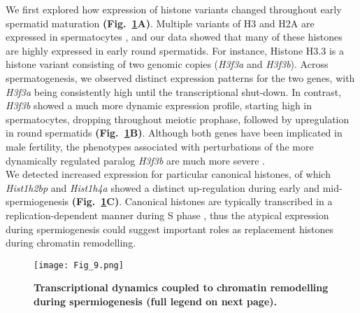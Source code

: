 We first explored how expression of histone variants changed throughout early spermatid maturation \textbf{(Fig.~\ref{fig3:spermiogenesis}A)}. Multiple variants of H3 and H2A are expressed in spermatocytes \citep{Greaves2006, Mahadevaiah2001, Tang2015}, and our data showed that many of these histones are highly expressed in early round spermatids. For instance, Histone H3.3 is a histone variant consisting of two genomic copies (\textit{H3f3a} and \textit{H3f3b}). Across spermatogenesis, we observed distinct expression patterns for the two genes, with \textit{H3f3a} being consistently high until the transcriptional shut-down. In contrast, \textit{H3f3b} showed a much more dynamic expression profile, starting high in spermatocytes, dropping throughout meiotic prophase, followed by upregulation in round spermatids \textbf{(Fig.~\ref{fig3:spermiogenesis}B)}. Although both genes have been implicated in male fertility, the phenotypes associated with perturbations of the more dynamically regulated paralog \textit{H3f3b} are much more severe \citep{Tang2015, Yuen2014}.\\

We detected increased expression for particular canonical histones, of which \textit{Hist1h2bp} and \textit{Hist1h4a} showed a distinct up-regulation during early and mid-spermiogenesis \textbf{(Fig.~\ref{fig3:spermiogenesis}C)}. Canonical histones are typically transcribed in a replication-dependent manner during S phase \citep{Marzluff2002}, thus the atypical expression during spermiogenesis could suggest important roles as replacement histones during chromatin remodelling.

\newpage

\begin{figure}[!h]
\centering
\texttt{[image: Fig\_9.png]}
\caption[Transcriptional dynamics and chromatin remodelling during spermiogenesis]{\textbf{Transcriptional dynamics coupled to chromatin remodelling during spermiogenesis (full legend on next page).}}
\label{fig3:spermiogenesis}
\end{figure}

\newpage

\captionsetup[figure]{list=no}
\addtocounter{figure}{-1}   
\captionsetup[figure]{list=yes}

